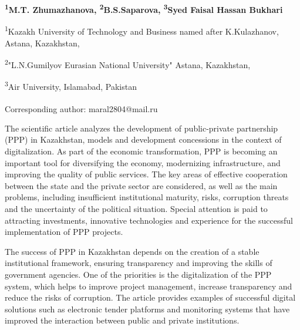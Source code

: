 
\begin{articleheader}

{\bfseries
\textsuperscript{1}M.T. Zhumazhanova\textsuperscript{\envelope },
\textsuperscript{2}B.S.Saparova,
\textsuperscript{3}Syed Faisal Hassan Bukhari
}
\end{articleheader}

\begin{affiliation}
\textsuperscript{1}Kazakh University of Technology and Business named after K.Kulazhanov, Astana, Kazakhstan,

\textsuperscript{2}"L.N.Gumilyov Eurasian National University" Astana, Kazakhstan,

\textsuperscript{3}Air University, Islamabad, Pakistan

\raggedright \textsuperscript{\envelope }Corresponding author: maral2804@mail.ru
\end{affiliation}

The scientific article analyzes the development of public-private
partnership (PPP) in Kazakhstan, models and development concessions in
the context of digitalization. As part of the economic transformation,
PPP is becoming an important tool for diversifying the economy,
modernizing infrastructure, and improving the quality of public
services. The key areas of effective cooperation between the state and
the private sector are considered, as well as the main problems,
including insufficient institutional maturity, risks, corruption threats
and the uncertainty of the political situation. Special attention is
paid to attracting investments, innovative technologies and experience
for the successful implementation of PPP projects.

The success of PPP in Kazakhstan depends on the creation of a stable
institutional framework, ensuring transparency and improving the skills
of government agencies. One of the priorities is the digitalization of
the PPP system, which helps to improve project management, increase
transparency and reduce the risks of corruption. The article provides
examples of successful digital solutions such as electronic tender
platforms and monitoring systems that have improved the interaction
between public and private institutions.

